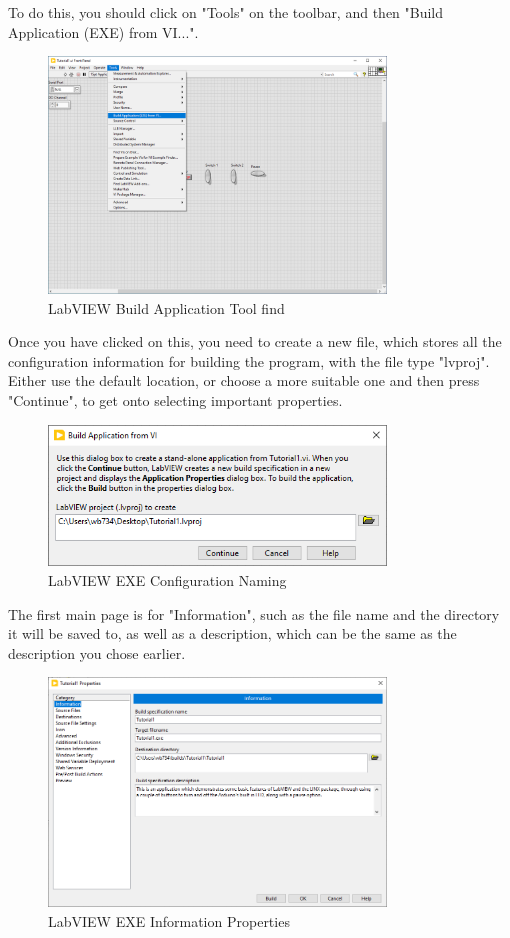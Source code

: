 \documentclass[a4paper,11pt]{report}
\begin{document}
To do this, you should click on "Tools" on the toolbar, and then "Build Application (EXE) from VI...".

\begin{figure}[H]
\centering
\includegraphics[width=0.8\textwidth]{screenshots/labview39}
\caption{LabVIEW Build Application Tool find}
\end{figure}

Once you have clicked on this, you need to create a new file, which stores all the configuration information for building the program, with the file type "lvproj". Either use the default location, or choose a more suitable one and then press "Continue", to get onto selecting important properties.

\begin{figure}[H]
\centering
\includegraphics[width=0.8\textwidth]{screenshots/labview40}
\caption{LabVIEW EXE Configuration Naming}
\end{figure}

The first main page is for "Information", such as the file name and the directory it will be saved to, as well as a description, which can be the same as the description you chose earlier.

\begin{figure}[H]
\centering
\includegraphics[width=0.8\textwidth]{screenshots/labview41}
\caption{LabVIEW EXE Information Properties}
\end{figure}
\end{document}
